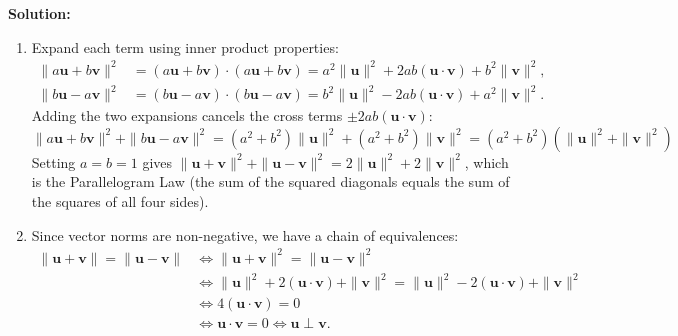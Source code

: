 \documentclass[11pt, letterpaper]{article}
\theoremstyle{definition}
\theoremstyle{remark}
\begin{document}
\textbf{Solution:}
\begin{enumerate}[label=(\alph*)]
    \item Expand each term using inner product properties:
    \begin{align*}
    \|a\mathbf{u} + b\mathbf{v}\|^2 &= (a\mathbf{u} + b\mathbf{v}) \cdot (a\mathbf{u} + b\mathbf{v}) = a^2\|\mathbf{u}\|^2 + 2ab(\mathbf{u} \cdot \mathbf{v}) + b^2\|\mathbf{v}\|^2, \\
    \|b\mathbf{u} - a\mathbf{v}\|^2 &= (b\mathbf{u} - a\mathbf{v}) \cdot (b\mathbf{u} - a\mathbf{v}) = b^2\|\mathbf{u}\|^2 - 2ab(\mathbf{u} \cdot \mathbf{v}) + a^2\|\mathbf{v}\|^2.
    \end{align*}
    Adding the two expansions cancels the cross terms $\pm 2ab(\mathbf{u} \cdot \mathbf{v})$:
    \[
    \|a\mathbf{u} + b\mathbf{v}\|^2 + \|b\mathbf{u} - a\mathbf{v}\|^2 = (a^2 + b^2)\|\mathbf{u}\|^2 + (a^2 + b^2)\|\mathbf{v}\|^2 = (a^2 + b^2)\left(\|\mathbf{u}\|^2 + \|\mathbf{v}\|^2\right)
    \]
    Setting $a = b = 1$ gives $\|\mathbf{u} + \mathbf{v}\|^2 + \|\mathbf{u} - \mathbf{v}\|^2 = 2\|\mathbf{u}\|^2 + 2\|\mathbf{v}\|^2$, which is the Parallelogram Law (the sum of the squared diagonals equals the sum of the squares of all four sides).
    \item Since vector norms are non-negative, we have a chain of equivalences:
    \begin{align*}
    \|\mathbf{u} + \mathbf{v}\| = \|\mathbf{u} - \mathbf{v}\| &\iff \|\mathbf{u} + \mathbf{v}\|^2 = \|\mathbf{u} - \mathbf{v}\|^2 \\
    &\iff \|\mathbf{u}\|^2 + 2(\mathbf{u} \cdot \mathbf{v}) + \|\mathbf{v}\|^2 = \|\mathbf{u}\|^2 - 2(\mathbf{u} \cdot \mathbf{v}) + \|\mathbf{v}\|^2 \\
    &\iff 4(\mathbf{u} \cdot \mathbf{v}) = 0 \\
    &\iff \mathbf{u} \cdot \mathbf{v} = 0 \iff \mathbf{u} \perp \mathbf{v}.
    \end{align*}
\end{enumerate}
\end{document}
